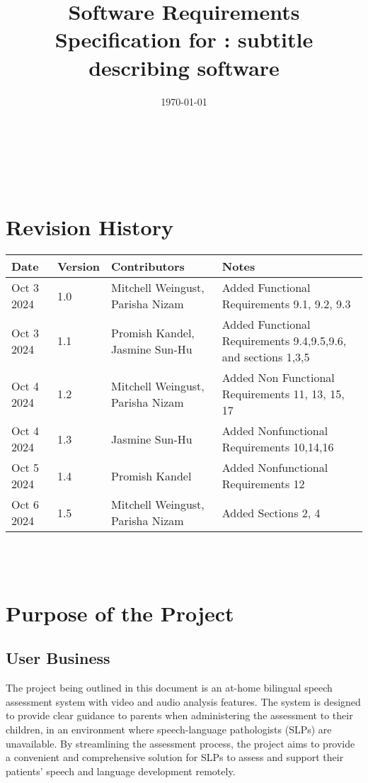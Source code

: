 \documentclass[12pt]{article}
\begin{document}
\title{Software Requirements Specification for \progname: subtitle describing software} 
\author{\authname}
\date{\today}
	
\maketitle

~\newpage


\tableofcontents

~\newpage

\section*{Revision History}

\begin{tabularx}{\textwidth}{p{2cm}p{1.5cm}p{3.5cm}X}
\toprule {\textbf{Date}} & {\textbf{Version}} & {\textbf{Contributors}} & {\textbf{Notes}}\\
\midrule
Oct 3 2024 & 1.0 & Mitchell Weingust, Parisha Nizam & Added Functional Requirements 9.1, 9.2, 9.3 \\
Oct 3 2024 & 1.1 & Promish Kandel, Jasmine Sun-Hu & Added Functional Requirements 9.4,9.5,9.6, and sections 1,3,5\\
Oct 4 2024 & 1.2 & Mitchell Weingust, Parisha Nizam & Added Non Functional Requirements 11, 13, 15, 17\\
Oct 4 2024 & 1.3 & Jasmine Sun-Hu & Added Nonfunctional Requirements 10,14,16\\
Oct 5 2024 & 1.4 & Promish Kandel & Added Nonfunctional Requirements 12\\
Oct 6 2024 & 1.5 & Mitchell Weingust, Parisha Nizam & Added Sections 2, 4\\
\bottomrule
\end{tabularx}

~\\

~\newpage
\section{Purpose of the Project}
\subsection{User Business}
\hspace{2em}The project being outlined in this document is an at-home bilingual speech 
assessment system with video and audio analysis features. The system is designed 
to provide clear guidance to parents when administering the assessment to their 
children, in an environment where speech-language pathologists (SLPs) are 
unavailable. By streamlining the assessment process, the project aims to provide a 
convenient and comprehensive solution for SLPs to assess and support their patients'
speech and language development remotely. 
\end{document}
